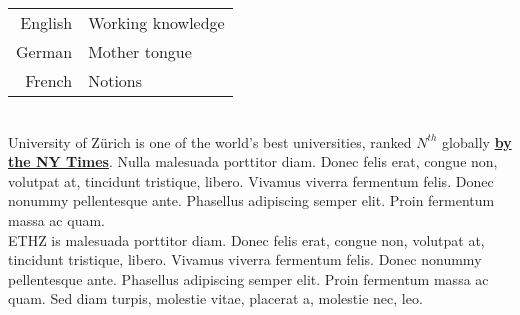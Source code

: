 \documentclass[theme]{si_template/en_cv}
\begin{document}
\begin{paracol}{2}
\begin{leftcolumn*}
{            
            \begin{minipage}[r]{\leftcolwidth}
                \begin{tabular}{r|l}
                    English & Working knowledge\\[0.3em]
                    German & Mother tongue\\[0.3em]
                    French & Notions
                \end{tabular}
            \end{minipage}
            \vspace{\sectionspace}
        }
        \end{leftcolumn*}
        \begin{rightcolumn}\noindent \small
            \phantom{} \\ %
            {University of Zürich is one of the world's best universities, ranked $N^{th}$ globally \href{http://example.com}{\textbf{by the NY Times}}.
            Nulla malesuada porttitor diam. Donec felis erat, congue non, volutpat at, tincidunt tristique, libero. Vivamus viverra fermentum felis. Donec nonummy pellentesque ante. Phasellus adipiscing semper elit. Proin fermentum massa ac quam.}
            \vspace{\itemspace}\\
            {ETHZ is malesuada porttitor diam. Donec felis erat, congue non, volutpat at, tincidunt tristique, libero. Vivamus viverra fermentum felis. Donec nonummy pellentesque ante. Phasellus adipiscing semper elit. Proin fermentum massa ac quam. Sed diam turpis, molestie vitae, placerat a, molestie nec, leo.}
        \vspace{\sectionspace}

\end{rightcolumn}
\end{paracol}
\end{document}
